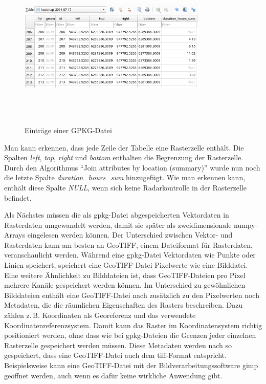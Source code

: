 \begin{figure}[h]
    \centering
    \includegraphics[width=0.8\textwidth,height=8cm,keepaspectratio=true]{content/images/GpkgExample.png}
    \caption{Einträge einer GPKG-Datei}
    \label{fig:GpkgExample}
\end{figure}

Man kann erkennen, dass jede Zeile der Tabelle eine Rasterzelle enthält.
Die Spalten \emph{left}, \emph{top}, \emph{right} und \emph{bottom} enthalten die Begrenzung der Rasterzelle.
Durch den Algorithmus "`Join attributes by location (summary)"' wurde nun noch die letzte Spalte \emph{duration\_hours\_sum} hinzugefügt.
Wie man erkennen kann, enthält diese Spalte \emph{NULL}, wenn sich keine Radarkontrolle in der Rasterzelle befindet.

Als Nächstes müssen die als \acrshort{gpkg}-Datei abgespeicherten Vektordaten in Rasterdaten umgewandelt werden, damit sie später als zweidimensionale numpy-Arrays eingelesen werden können.
Der Unterschied zwischen Vektor- und Rasterdaten kann am besten an GeoTIFF, einem Dateiformat für Rasterdaten, veranschaulicht werden.
Während eine \acrshort{gpkg}-Datei Vektordaten wie Punkte oder Linien speichert, speichert eine GeoTIFF-Datei Pixelwerte wie eine Bilddatei.
Eine weitere Ähnlichkeit zu Bilddateien ist, dass GeoTIFF-Dateien pro Pixel mehrere Kanäle gespeichert werden können.
Im Unterschied zu gewöhnlichen Bilddateien enthält eine GeoTIFF-Datei nach \cite[S. 128]{PracticalGIS} zusätzlich zu den Pixelwerten noch Metadaten, die die räumlichen Eigenschaften des Rasters beschreiben.
Dazu zählen z.\,B. Koordinaten als Georeferenz und das verwendete Koordinatenreferenzsystem.
Damit kann das Raster im Koordinatensystem richtig positioniert werden, ohne dass wie bei \acrshort{gpkg}-Dateien die Grenzen jeder einzelnen Rasterzelle gespeichert werden müssen.
Diese Metadaten werden nach \cite{GeoTIFFStandard} so gespeichert, dass eine GeoTIFF-Datei auch dem \acrshort{tiff}-Format entspricht.
Beispielsweise kann eine GeoTIFF-Datei mit der Bildverarbeitungssoftware \acrfull{gimp} geöffnet werden, auch wenn es dafür keine wirkliche Anwendung gibt.


